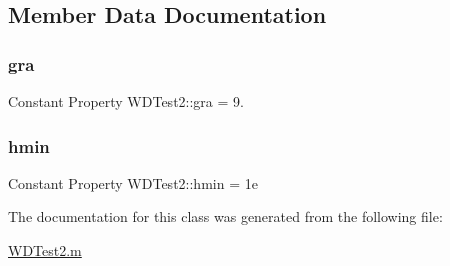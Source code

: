 \subsection{Member Data Documentation}
\mbox{\label{class_w_d_test2_af1108f60d556ea1adc21fc218e053d94}} 
\subsubsection{\texorpdfstring{gra}{gra}}
{\footnotesize\ttfamily Constant Property W\+D\+Test2\+::gra = 9.}

\mbox{\label{class_w_d_test2_af0fee435fd480238cca0b66f9baa4e8c}} 
\subsubsection{\texorpdfstring{hmin}{hmin}}
{\footnotesize\ttfamily Constant Property W\+D\+Test2\+::hmin = 1e}



The documentation for this class was generated from the following file\+:\begin{DoxyCompactItemize}
\item 
\hyperlink{_w_d_test2_8m}{W\+D\+Test2.\+m}\end{DoxyCompactItemize}
